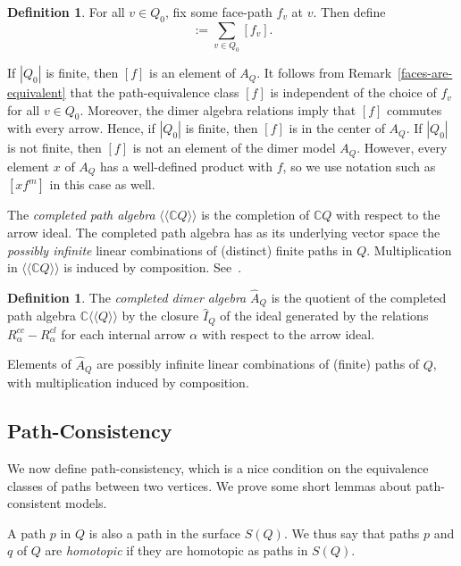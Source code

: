 \documentclass{article}
\theoremstyle{definition}
\newtheorem{defn}[thm]{Definition}
\begin{document}
\begin{defn}
    For all $v\in Q_0$, fix some face-path $f_v$ at $v$. Then define
    \begin{equation}
	    [f]:=\sum_{v\in Q_0}[f_v].
    \end{equation}
\end{defn}

If $|Q_0|$ is finite, then $[f]$ is an element of $A_Q$. It follows from Remark~\ref{faces-are-equivalent} that the path-equivalence class $[f]$ is independent of the choice of $f_v$ for all $v\in Q_0$. Moreover, the dimer algebra relations imply that $[f]$ commutes with every arrow. Hence, if $|Q_0|$ is finite, then $[f]$ is in the center of $A_Q$. 
If $|Q_0|$ is not finite, then $[f]$ 
is not an element of the dimer model $A_Q$.
However, every element $x$ of $A_Q$ has a well-defined product with $f$, so we use notation such as $[xf^m]$ in this case as well. 

The \textit{completed path algebra} $\langle\langle\mathbb CQ\rangle\rangle$ is the completion of $\mathbb CQ$ with respect to the arrow ideal. The completed path algebra has as its underlying vector space the \textit{possibly infinite} linear combinations of (distinct) finite paths in $Q$. Multiplication in $\langle\langle\mathbb CQ\rangle\rangle$ is induced by composition. See~\cite[Definition 2.6]{XPressland2020}.

\begin{defn}\label{defn:completed-dimer-algebra}
	The \textit{completed dimer algebra} $\widehat A_Q$ is the quotient of the completed path algebra $\mathbb C\langle\langle Q\rangle\rangle$ by the closure $\widehat I_Q$ of the ideal generated by the relations $R_\alpha^{cc}-R_\alpha^{cl}$ for each internal arrow $\alpha$ with respect to the arrow ideal.
\end{defn}

Elements of $\widehat A_Q$ are possibly infinite linear combinations of (finite) paths of $Q$, with multiplication induced by composition.

\subsection{Path-Consistency}\label{sec:hc}

We now define path-consistency, which is a nice 
condition on the equivalence classes of paths between two vertices. We prove some short lemmas about path-consistent models.

A path $p$ in $Q$ is also a path in the surface $S(Q)$. We thus say that paths $p$ and $q$ of $Q$ are \textit{homotopic} if they are homotopic as paths in $S(Q)$.
\end{document}
